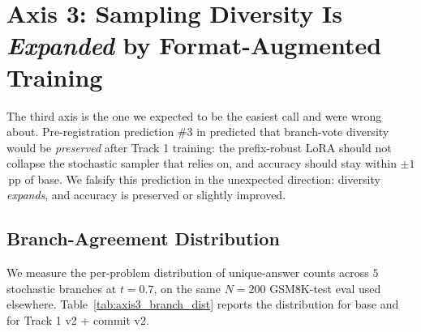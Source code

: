 \section{Axis 3: Sampling Diversity Is \emph{Expanded} by Format-Augmented Training}
\label{sec:axis3}

The third axis is the one we expected to be the easiest call and
were wrong about.  Pre-registration prediction \#3 in
 predicted that branch-vote diversity would
be \emph{preserved} after Track 1 training: the prefix-robust LoRA
should not collapse the stochastic sampler that \cmaj{} relies on,
and \cmaj{} accuracy should stay within $\pm 1$\,pp of base.  We
falsify this prediction in the unexpected direction: diversity
\emph{expands}, and \cmaj{} accuracy is preserved or slightly
improved.

\subsection{Branch-Agreement Distribution}
\label{subsec:axis3_distribution}

We measure the per-problem distribution of unique-answer counts
across $5$ stochastic branches at $t{=}0.7$, on the same $N{=}200$
GSM8K-test eval used elsewhere.
Table~\ref{tab:axis3_branch_dist} reports the distribution for
base \LLaDA{} and for Track 1 v2 + commit v2.

